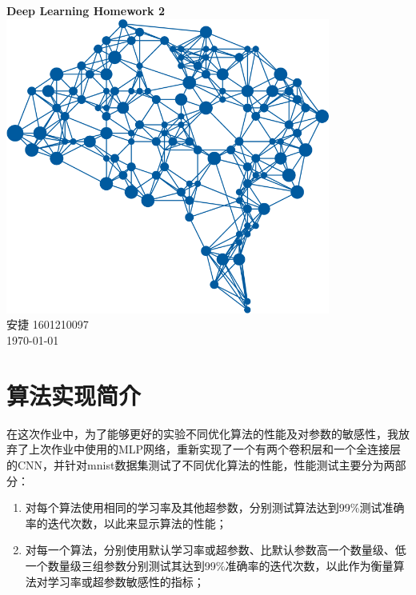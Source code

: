\documentclass[a4paper, UTF8]{ctexrep}
\begin{document}
	\begin{titlepage}
		\centering
		\vspace{6cm}
		\LARGE{\textbf{Deep Learning Homework 2}}\\
		\vspace{4cm}
		\includegraphics[width=0.8\textwidth]{deepLearning.png}\\
		\vspace{4cm}
		\normalsize{安捷 1601210097}\\
		\normalsize{\today}
	\end{titlepage}
		\section{算法实现简介}
			在这次作业中，为了能够更好的实验不同优化算法的性能及对参数的敏感性，我放弃了上次作业中使用的MLP网络，重新实现了一个有两个卷积层和一个全连接层的CNN，并针对mnist数据集测试了不同优化算法的性能，性能测试主要分为两部分：
			\begin{enumerate}
				\item 对每个算法使用相同的学习率及其他超参数，分别测试算法达到99\%测试准确率的迭代次数，以此来显示算法的性能；
				\item 对每一个算法，分别使用默认学习率或超参数、比默认参数高一个数量级、低一个数量级三组参数分别测试其达到99\%准确率的迭代次数，以此作为衡量算法对学习率或超参数敏感性的指标；
			\end{enumerate}
\end{document}
